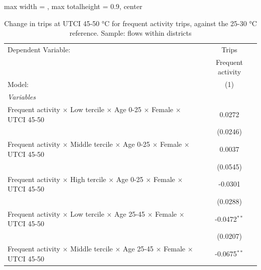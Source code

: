 
\begin{table}[htbp]
   \caption{\label{table_intersectionality_frequent_activity_45-50} Change in trips at UTCI 45-50 °C for frequent activity trips, against the 25-30 °C reference. Sample: flows within districts}
   \centering
   \small
   \begin{adjustbox}{max width = \textwidth, max totalheight = 0.9\textheight, center}
      \begin{tabular}{lc}
         \tabularnewline \midrule \midrule
         Dependent Variable:                                                                                   & Trips\\  
                                                                                                               & Frequent activity \\   
         Model:                                                                                                & (1)\\  
         \midrule
         \emph{Variables}\\
         Frequent activity $\times$ Low tercile $\times$ Age 0-25 $\times$ Female $\times$ UTCI 45-50          & 0.0272\\   
                                                                                                               & (0.0246)\\   
         Frequent activity $\times$ Middle tercile $\times$ Age 0-25 $\times$ Female $\times$ UTCI 45-50       & 0.0037\\   
                                                                                                               & (0.0545)\\   
         Frequent activity $\times$ High tercile $\times$ Age 0-25 $\times$ Female $\times$ UTCI 45-50         & -0.0301\\   
                                                                                                               & (0.0288)\\   
         Frequent activity $\times$ Low tercile $\times$ Age 25-45 $\times$ Female $\times$ UTCI 45-50         & -0.0472$^{**}$\\   
                                                                                                               & (0.0207)\\   
         Frequent activity $\times$ Middle tercile $\times$ Age 25-45 $\times$ Female $\times$ UTCI 45-50      & -0.0675$^{**}$\\   

\end{tabular}
\end{adjustbox}
\end{table}
